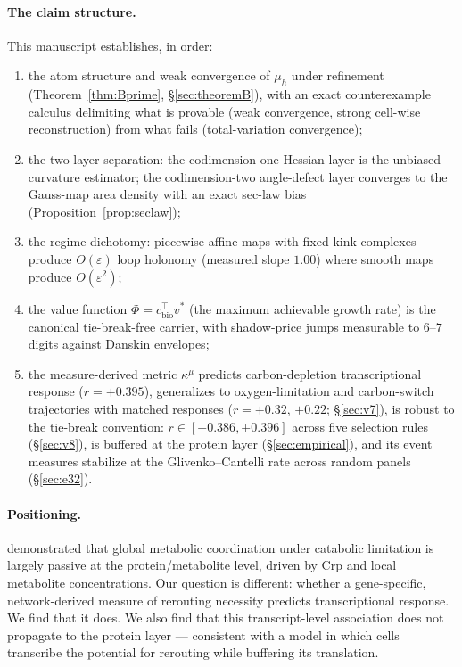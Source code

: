 \documentclass[11pt,a4paper]{article}
\theoremstyle{plain}
\theoremstyle{definition}
\theoremstyle{remark}
\newcommand{\kmu}{\kappa^{\mu}}
\begin{document}
\paragraph{The claim structure.}
This manuscript establishes, in order:
\begin{enumerate}[label=(\roman*)]
\item the atom structure and weak convergence of $\mu_h$
      under refinement (Theorem~\ref{thm:Bprime}, \S\ref{sec:theoremB}), with an exact counterexample calculus delimiting what is provable (weak convergence, strong cell-wise reconstruction) from what fails (total-variation convergence);
\item the two-layer separation: the codimension-one Hessian
      layer is the unbiased curvature estimator; the codimension-two
      angle-defect layer converges to the Gauss-map area density with an
      exact sec-law bias (Proposition~\ref{prop:seclaw});
\item the regime dichotomy: piecewise-affine maps with fixed
      kink complexes produce $O(\varepsilon)$ loop holonomy (measured slope
      $1.00$) where smooth maps produce $O(\varepsilon^2)$;
\item the value function $\Phi = c_{\mathrm{bio}}^\top v^*$
      (the maximum achievable growth rate)
      is the canonical tie-break-free carrier, with shadow-price jumps
      measurable to $6$--$7$ digits against Danskin envelopes;
\item the measure-derived metric $\kmu$ predicts
      carbon-depletion transcriptional response ($r = +0.395$),
      generalizes to oxygen-limitation and carbon-switch trajectories
      with matched responses ($r = +0.32$, $+0.22$; \S\ref{sec:v7}), is
      robust to the tie-break convention: $r \in [+0.386, +0.396]$
      across five selection rules (\S\ref{sec:v8}), is buffered at the
      protein layer
      (\S\ref{sec:empirical}), and its event measures stabilize at
      the Glivenko--Cantelli rate across random panels (\S\ref{sec:e32}).
\end{enumerate}

\paragraph{Positioning.}
\citet{kochanowski2013} demonstrated that global metabolic coordination under
catabolic limitation is largely passive at the protein/metabolite level,
driven by Crp and local metabolite concentrations. Our question is different: whether a gene-specific, network-derived
measure of rerouting necessity predicts transcriptional response. We
find that it does. We also find that this transcript-level association
does not propagate to the protein layer --- consistent with a model in
which cells transcribe the potential for rerouting while buffering
its translation.
\end{document}
